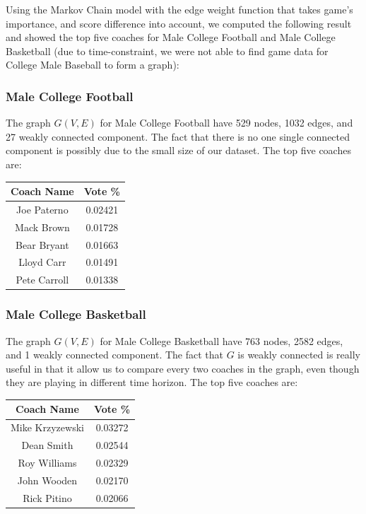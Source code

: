 \documentclass[titlepage]{article}
\begin{document}
Using the Markov Chain model with the edge weight function that takes game's importance, and score difference into account, we computed the following result and showed the top five coaches for Male College Football and Male College Basketball (due to time-constraint, we were not able to find game data for College Male Baseball to form a graph):

\subsubsection*{Male College Football}

\noindent The graph $G(V, E)$ for Male College Football have 529 nodes, 1032 edges, and 27 weakly connected component. The fact that there is no one single connected component is possibly due to the small size of our dataset. The top five coaches are:

\begin{center}
\begin{tabular}{ | c | c | }
\hline
Coach Name   & Vote \% \\\hline
Joe Paterno  & 0.02421 \\\hline
Mack Brown   & 0.01728 \\\hline
Bear Bryant  & 0.01663 \\\hline
Lloyd Carr   & 0.01491 \\\hline
Pete Carroll & 0.01338 \\
\hline
\end{tabular}
\end{center}

\subsubsection*{Male College Basketball}

\noindent The graph $G(V, E)$ for Male College Basketball have 763 nodes, 2582 edges, and 1 weakly connected component. The fact that $G$ is weakly connected is really useful in that it allow us to compare every two coaches in the graph, even though they are playing in different time horizon. The top five coaches are:

\begin{center}
\begin{tabular}{ | c | c | }
\hline
Coach Name  & Vote \% \\\hline
Mike Krzyzewski & 0.03272 \\\hline
Dean Smith  & 0.02544 \\\hline
Roy Williams & 0.02329 \\\hline
John Wooden  & 0.02170 \\\hline
Rick Pitino  & 0.02066 \\
\hline
\end{tabular}
\end{center}
\end{document}
